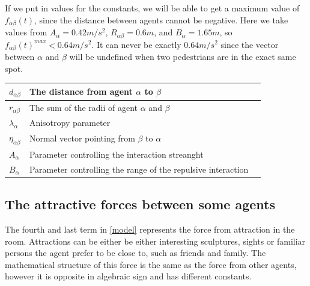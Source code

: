 If we put in values for the constants, we will be able to get a maximum value of $ f_{\alpha\beta}(t) $, 
since the distance between agents cannot be negative. Here we take values from \cite{ABconstant} $ A_{\alpha} = 0.42 m/s^{2} $, 
$ R_{\alpha\beta} = 0.6 m $, and $ B_{\alpha} = 1.65 m $, so 
$ f_{\alpha\beta}(t)^{max} < 0.64 m/s^{2} $. It can never be exactly $0.64m/s^2$ since the vector between $\alpha$ and $\beta$ will be undefined when two pedestrians are in the exact same spot.


\begin{center}
\begin{tabular}{lll}
\hline
$d_{\alpha \beta}$& The distance from agent $\alpha$ to $\beta$ &\\
\hline
$r_{\alpha\beta}$& The sum of the radii of agent $\alpha$ and $\beta$ \\
\hline
$\lambda_{\alpha}$& Anisotropy parameter &\\
\hline
$\eta_{\alpha \beta}$& Normal vector pointing from $\beta$ to $\alpha$ \\
\hline
$A_{\alpha}$& Parameter controlling the interaction streanght \\
\hline
$B_{\alpha}$& Parameter controlling the range of the repulsive interaction  \\
\hline
\end{tabular}
\end{center}

\subsection{The attractive forces between some agents}
The fourth and last term in \eqref{model} represents the force from attraction 
in the room. Attractions can be either be either interesting sculptures, 
sights or familiar persons the agent prefer to be close to, such as friends 
and family. The mathematical structure of this force is the same as the force 
from other agents, however it is opposite in algebraic sign and has different 
constants. 

